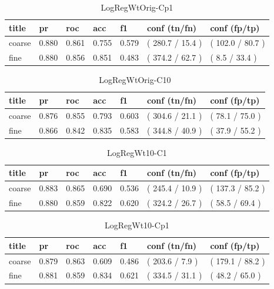\documentclass[ms]{nuthesis}
\begin{document}
\FloatBarrier
\begin{table}[h]
\centering
\begin{tabular}{|l||l||l||l||l||l||l|}\toprule
title & pr & roc & acc & f1 & conf (tn/fn) & conf (fp/tp) \\ \midrule
coarse & 0.880 & 0.861 & 0.755 & 0.579 & ( 280.7 / 15.4 ) & ( 102.0 / 80.7 ) \\
fine & 0.880 & 0.856 & 0.851 & 0.483 & ( 374.2 / 62.7 ) & ( 8.5 / 33.4 ) \\ \bottomrule
\end{tabular}
\caption{LogRegWtOrig-Cp1}
\label{tab:LogRegWtOrig-Cp1}
\end{table}
\FloatBarrier


\FloatBarrier
\begin{table}[h]
\centering
\begin{tabular}{|l||l||l||l||l||l||l|}\toprule
title & pr & roc & acc & f1 & conf (tn/fn) & conf (fp/tp) \\ \midrule
coarse & 0.876 & 0.855 & 0.793 & 0.603 & ( 304.6 / 21.1 ) & ( 78.1 / 75.0 ) \\
fine & 0.866 & 0.842 & 0.835 & 0.583 & ( 344.8 / 40.9 ) & ( 37.9 / 55.2 ) \\ \bottomrule
\end{tabular}
\caption{LogRegWtOrig-C10}
\label{tab:LogRegWtOrig-C10}
\end{table}
\FloatBarrier


\FloatBarrier
\begin{table}[h]
\centering
\begin{tabular}{|l||l||l||l||l||l||l|}\toprule
title & pr & roc & acc & f1 & conf (tn/fn) & conf (fp/tp) \\ \midrule
coarse & 0.883 & 0.865 & 0.690 & 0.536 & ( 245.4 / 10.9 ) & ( 137.3 / 85.2 ) \\
fine & 0.880 & 0.859 & 0.822 & 0.620 & ( 324.2 / 26.7 ) & ( 58.5 / 69.4 ) \\ \bottomrule
\end{tabular}
\caption{LogRegWt10-C1}
\label{tab:LogRegWt10-C1}
\end{table}
\FloatBarrier


\FloatBarrier
\begin{table}[h]
\centering
\begin{tabular}{|l||l||l||l||l||l||l|}\toprule
title & pr & roc & acc & f1 & conf (tn/fn) & conf (fp/tp) \\ \midrule
coarse & 0.879 & 0.863 & 0.609 & 0.486 & ( 203.6 / 7.9 ) & ( 179.1 / 88.2 ) \\
fine & 0.881 & 0.859 & 0.834 & 0.621 & ( 334.5 / 31.1 ) & ( 48.2 / 65.0 ) \\ \bottomrule
\end{tabular}
\caption{LogRegWt10-Cp1}
\label{tab:LogRegWt10-Cp1}
\end{table}
\FloatBarrier
\end{document}
